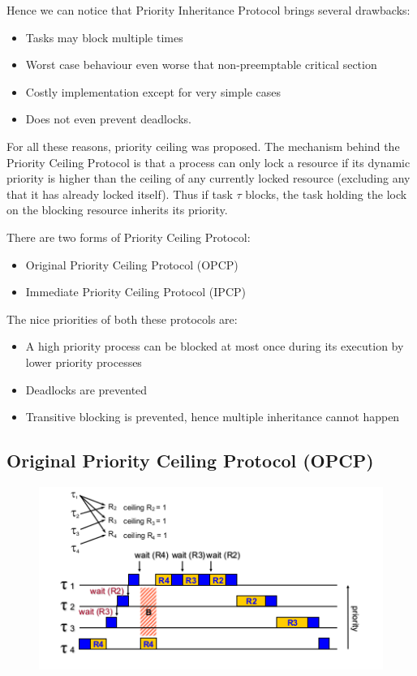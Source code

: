 Hence we can notice that Priority Inheritance Protocol brings several drawbacks:
\begin{itemize}
    \item Tasks may block multiple times
    \item Worst case behaviour even worse that non-preemptable critical section
    \item Costly implementation except for very simple cases
    \item Does not even prevent deadlocks.
\end{itemize}

For all these reasons, priority ceiling was proposed.
The mechanism behind the Priority Ceiling Protocol is that a process can only lock a resource if its dynamic priority is higher than the ceiling of any currently locked resource (excluding any that it has already locked itself).
Thus if task $\tau$ blocks, the task holding the lock on the blocking resource inherits its priority.

There are two forms of Priority Ceiling Protocol:
\begin{itemize}
    \item Original Priority Ceiling Protocol (OPCP)
    \item Immediate Priority Ceiling Protocol (IPCP)
\end{itemize}

The nice priorities of both these protocols are:
\begin{itemize}
    \item A high priority process can be blocked at most once during its execution by lower priority processes
    \item Deadlocks are prevented
    \item Transitive blocking is prevented, hence multiple inheritance cannot happen
\end{itemize}


\subsection{Original Priority Ceiling Protocol (OPCP)}

\begin{figure}[!h]
    \centering
    \includegraphics[width=.75\textwidth]{images/image12.png}
\end{figure}

